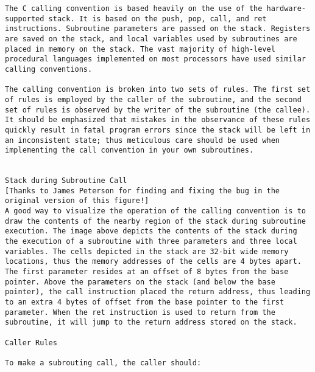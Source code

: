\documentclass[10pt]{article}
\begin{document}
{\begin{multicols*}{5}
\begin{lstlisting}[breaklines=true,columns=fullflexible]
The C calling convention is based heavily on the use of the hardware-supported stack. It is based on the push, pop, call, and ret instructions. Subroutine parameters are passed on the stack. Registers are saved on the stack, and local variables used by subroutines are placed in memory on the stack. The vast majority of high-level procedural languages implemented on most processors have used similar calling conventions.

The calling convention is broken into two sets of rules. The first set of rules is employed by the caller of the subroutine, and the second set of rules is observed by the writer of the subroutine (the callee). It should be emphasized that mistakes in the observance of these rules quickly result in fatal program errors since the stack will be left in an inconsistent state; thus meticulous care should be used when implementing the call convention in your own subroutines.


Stack during Subroutine Call 
[Thanks to James Peterson for finding and fixing the bug in the original version of this figure!]
A good way to visualize the operation of the calling convention is to draw the contents of the nearby region of the stack during subroutine execution. The image above depicts the contents of the stack during the execution of a subroutine with three parameters and three local variables. The cells depicted in the stack are 32-bit wide memory locations, thus the memory addresses of the cells are 4 bytes apart. The first parameter resides at an offset of 8 bytes from the base pointer. Above the parameters on the stack (and below the base pointer), the call instruction placed the return address, thus leading to an extra 4 bytes of offset from the base pointer to the first parameter. When the ret instruction is used to return from the subroutine, it will jump to the return address stored on the stack.

Caller Rules

To make a subrouting call, the caller should:


\end{lstlisting}
\end{multicols*}}
\end{document}
